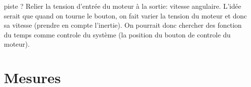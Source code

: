 \documentclass[11pt,a4paper]{article}
\begin{document}
piste ? Relier la tension d'entrée du moteur à la sortie: vitesse angulaire. L'idée serait que quand on tourne le bouton, on fait varier la tension du moteur et donc sa vitesse (prendre en compte l'inertie). On pourrait donc chercher des fonction du temps comme controle du système (la position du bouton de controle du moteur).



\section{Mesures}




 
\end{document}
